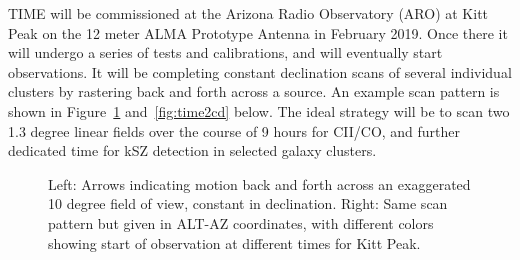 \documentclass[manuscript]{aastex}
\begin{document}
TIME will be commissioned at the Arizona Radio Observatory (ARO) at Kitt Peak on the 12 meter ALMA Prototype Antenna in February 2019. Once there it will undergo a series of tests and calibrations, and will eventually start observations. It will be completing constant declination scans of several individual clusters by rastering back and forth across a source. An example scan pattern is shown in Figure~\ref{fig:time2ab}  and~\ref{fig:time2cd} below. The ideal strategy will be to scan two 1.3 degree linear fields over the course of 9 hours for CII/CO, and further dedicated time for kSZ detection in selected galaxy clusters.

\begin{figure}[H]%
    \centering
    \qquad
    \singlespace
    \caption[TIME Scan Strategy 1]{Left: Arrows indicating motion back and forth across an exaggerated 10 degree field of view, constant in declination. Right: Same scan pattern but given in ALT-AZ coordinates, with different colors showing start of observation at different times for Kitt Peak.}%
    \label{fig:time2ab}%
\end{figure}
\end{document}
